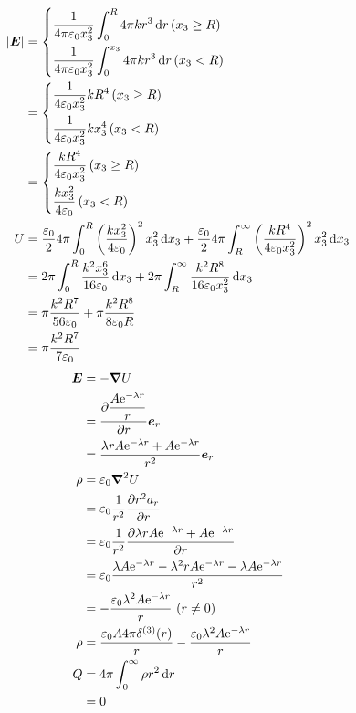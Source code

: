 \begin{align*}
    \left|\boldsymbol{E}\right|&=\left\{\begin{aligned}
        &\frac{1}{4\pi\varepsilon_0 x_3^2}\int_{0}^{R}4\pi kr^3\dif r\,(x_3\ge R)\\
        &\frac{1}{4\pi\varepsilon_0 x_3^2}\int_{0}^{x_3}4\pi kr^3\dif r\,(x_3<R)
    \end{aligned}\right.\\
    &=\left\{\begin{aligned}
        &\frac{1}{4\varepsilon_0 x_3^2}kR^4\,(x_3\ge R)\\
        &\frac{1}{4\varepsilon_0 x_3^2}kx_3^4\,(x_3<R)
    \end{aligned}\right.\\
    &=\left\{\begin{aligned}
        &\frac{kR^4}{4\varepsilon_0 x_3^2}\,(x_3\ge R)\\
        &\frac{kx_3^2}{4\varepsilon_0}\,(x_3<R)
    \end{aligned}\right.\\
    U&=\frac{\varepsilon_0}{2}4\pi\int_{0}^{R}\left(\frac{kx_3^2}{4\varepsilon_0}\right)^2x_3^2\dif x_3
    +\frac{\varepsilon_0}{2}4\pi\int_{R}^{\infty}\left(\frac{kR^4}{4\varepsilon_0 x_3^2}\right)^2x_3^2\dif x_3\\
    &=2\pi\int_{0}^{R}\frac{k^2x_3^6}{16\varepsilon_0}\dif x_3
    +2\pi\int_{R}^{\infty}\frac{k^2R^8}{16\varepsilon_0 x_3^2}\dif x_3\\
    &=\pi\frac{k^2R^7}{56\varepsilon_0}
    +\pi\frac{k^2R^8}{8\varepsilon_0 R}\\
    &=\pi\frac{k^2R^7}{7\varepsilon_0}
\end{align*}
\begin{align*}
    \boldsymbol{E}&=-\boldsymbol{\nabla}U\\
    &=\dfrac{\partial \dfrac{A\mathrm{e}^{-\lambda r}}{r}}{\partial r}\boldsymbol{e}_r\\
    &=\dfrac{\lambda rA\mathrm{e}^{-\lambda r}+A\mathrm{e}^{-\lambda r}}{r^2}\boldsymbol{e}_r\\
    \rho&=\varepsilon_0\boldsymbol{\nabla}^2U\\
    &=\varepsilon_0\frac{1}{r^2}\dfrac{\partial r^2a_r}{\partial r}\\
    &=\varepsilon_0\frac{1}{r^2}\dfrac{\partial \lambda rA\mathrm{e}^{-\lambda r}+A\mathrm{e}^{-\lambda r}}{\partial r}\\
    &=\varepsilon_0\dfrac{\lambda A\mathrm{e}^{-\lambda r}
    -\lambda^2 rA\mathrm{e}^{-\lambda r}
    -\lambda A\mathrm{e}^{-\lambda r}}{r^2}\\
    &=-\dfrac{\varepsilon_0
    \lambda^2 A\mathrm{e}^{-\lambda r}
    }{r}\, \,(r\neq 0)\\
    \rho&=\dfrac{\varepsilon_0
    A4\pi\delta^{(3)}(r)
    }{r}
    -\dfrac{\varepsilon_0
    \lambda^2 A\mathrm{e}^{-\lambda r}
    }{r}\\
    Q&=4\pi\int_{0}^{\infty}\rho r^2\dif r\\
    &=0
\end{align*}

